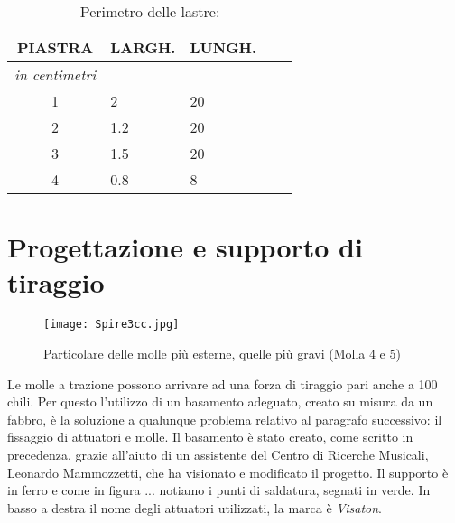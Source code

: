 \begin{table}[htp]
\caption{Perimetro delle lastre:}
\begin{center}

\begin{tabular}{cp{2cm}p{2cm}p{.2cm}p{2cm}} \textbf{PIASTRA}&\textbf{LARGH.}&\textbf{LUNGH.}\\
\hline \textit{in centimetri} \\
\hline 1&2&20\\
\hline 2&1.2&20\\
\hline 3&1.5&20\\
\hline 4&0.8&8\\
\end{tabular}

\end{center}
\label{default}
\end{table}%


\section{Progettazione e supporto di tiraggio}


\begin{figure}[htbp]
\begin{center}
\texttt{[image: Spire3cc.jpg]}
\caption{Particolare delle molle più esterne, quelle più gravi (Molla 4 e 5)}
\label{default}
\end{center}
\end{figure}

Le molle a trazione possono arrivare ad una forza di tiraggio pari anche a 100 chili. Per questo l'utilizzo di un basamento adeguato, creato su misura da un fabbro, è la soluzione a qualunque problema relativo al paragrafo successivo: il fissaggio di attuatori e molle.
Il basamento è stato creato, come scritto in precedenza, grazie all'aiuto di un assistente del Centro di Ricerche Musicali, Leonardo Mammozzetti, che ha visionato e modificato il progetto. Il supporto è in ferro e come in figura ... notiamo i punti di saldatura, segnati in verde. In basso a destra il nome degli attuatori utilizzati, la marca è \emph{Visaton}.

